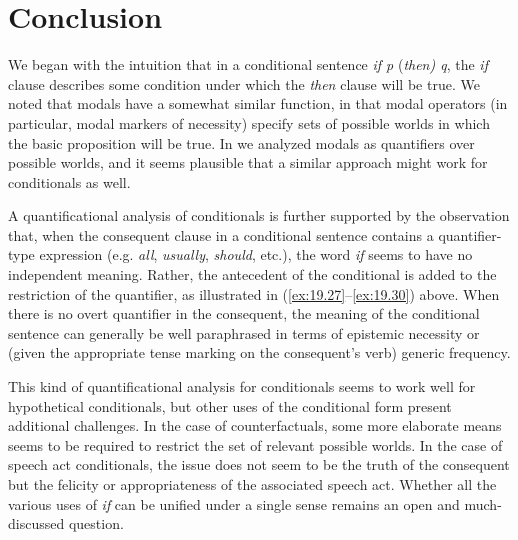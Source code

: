 \section{Conclusion}\label{sec:19.8}

We began with the intuition that in a conditional sentence \textit{if p} (\textit{then) q}, the \textit{if} clause describes some condition under which the \textit{then} clause will be true. We noted that modals have a somewhat similar function, in that modal operators (in particular, modal markers of necessity) specify sets of possible worlds in which the basic proposition will be true. In  we analyzed modals as quantifiers over possible worlds, and it seems plausible that a similar approach might work for conditionals as well.



A quantificational analysis of conditionals is further supported by the observation that, when the consequent clause in a conditional sentence contains a quantifier-type expression (e.g. \textit{all}, \textit{usually}, \textit{should}, etc.), the word \textit{if} seems to have no independent meaning. Rather, the antecedent of the conditional is added to the restriction of the quantifier, as illustrated in (\ref{ex:19.27}--\ref{ex:19.30}) above. When there is no overt quantifier in the consequent, the meaning of the conditional sentence can generally be well paraphrased in terms of epistemic necessity or (given the appropriate tense marking on the consequent’s verb) generic frequency.



This kind of quantificational analysis for conditionals seems to work well for hypothetical conditionals, but other uses of the conditional form present additional challenges. In the case of counterfactuals, some more elaborate means seems to be required to restrict the set of relevant possible worlds. In the case of speech act conditionals, the issue does not seem to be the truth of the consequent but the felicity or appropriateness of the associated speech act. Whether all the various uses of \textit{if} can be unified under a single sense remains an open and much-discussed question.




